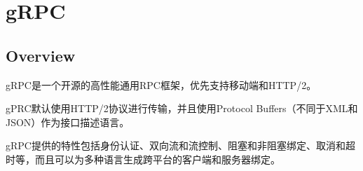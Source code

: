\part{gRPC}

\chapter{Overview}

gRPC是一个开源的高性能通用RPC框架，优先支持移动端和HTTP/2。


gPRC默认使用HTTP/2协议进行传输，并且使用Protocol Buffers（不同于XML和JSON）作为接口描述语言。

gRPC提供的特性包括身份认证、双向流和流控制、阻塞和非阻塞绑定、取消和超时等，而且可以为多种语言生成跨平台的客户端和服务器绑定。

